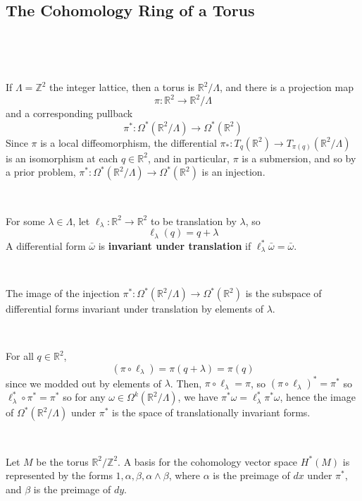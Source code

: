 \documentclass{article}
\begin{document}
\subsection{The Cohomology Ring of a Torus}
\

\begin{example}
\

If $\Lambda = \mathbb{Z}^2$ the integer lattice, then a torus is $\mathbb{R}^2/\Lambda$, and there is a projection map $$\pi: \mathbb{R}^2 \to \mathbb{R}^2/\Lambda$$and a corresponding pullback $$\pi^*: \Omega^*(\mathbb{R}^2/\Lambda) \to \Omega^*(\mathbb{R}^2)$$Since $\pi$ is a local diffeomorphism, the differential $\pi_*: T_q(\mathbb{R}^2) \to T_{\pi(q)}(\mathbb{R}^2/\Lambda)$ is an isomorphism at each $q \in \mathbb{R}^2$, and in particular, $\pi$ is a submersion, and so by a prior problem, $\pi^*: \Omega^*(\mathbb{R}^2/\Lambda) \to \Omega^*(\mathbb{R}^2)$ is an injection. 
\end{example}

\begin{definition}
\

For some $\lambda \in \Lambda$, let $\ell_\lambda: \mathbb{R}^2 \to \mathbb{R}^2$ to be translation by $\lambda$, so $$\ell_\lambda(q) = q + \lambda$$A differential form $\bar{\omega}$ is \textbf{invariant under translation} if $\ell_\lambda^*\bar{\omega} = \bar{\omega}$. 
\end{definition}

\begin{proposition}
\

The image of the injection $\pi^*: \Omega^*(\mathbb{R}^2/\Lambda) \to \Omega^*(\mathbb{R}^2)$ is the subspace of differential forms invariant under translation by elements of $\lambda$.
\end{proposition}

\begin{customproof}
\

For all $q \in \mathbb{R}^2$, $$(\pi \circ \ell_\lambda) = \pi(q + \lambda) = \pi(q)$$since we modded out by elements of $\lambda$. Then, $\pi \circ \ell_\lambda = \pi$, so $(\pi \circ \ell_\lambda)^* = \pi^*$ so $\ell_\lambda^* \circ \pi^* = \pi^*$ so for any $\omega \in \Omega^k(\mathbb{R}^2/\Lambda)$, we have $\pi^*\omega = \ell_\lambda^*\pi^*\omega$, hence the image of $\Omega^*(\mathbb{R}^2/\Lambda)$ under $\pi^*$ is the space of translationally invariant forms.
\end{customproof}

\begin{proposition}
\

Let $M$ be the torus $\mathbb{R}^2/\mathbb{Z}^2$. A basis for the cohomology vector space $H^*(M)$ is represented by the forms $1, \alpha, \beta, \alpha \wedge \beta$, where $\alpha$ is the preimage of $dx$ under $\pi^*$, and $\beta$ is the preimage of $dy$.
\end{proposition}
\end{document}
